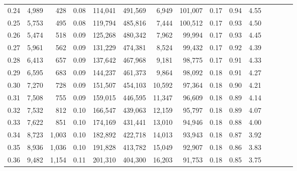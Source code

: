 \begin{tabular}{rrrcrrrrrrrrrrr}
0.24 &   4,989 &    428 &                                       0.08 &  114,041 &  491,569 &    6,949 &  101,007 &  0.17 &  0.94 &                         4.55 \\
0.25 &   5,753 &    495 &                                       0.08 &  119,794 &  485,816 &    7,444 &  100,512 &  0.17 &  0.93 &                         4.50 \\
0.26 &   5,474 &    518 &                                       0.09 &  125,268 &  480,342 &    7,962 &   99,994 &  0.17 &  0.93 &                         4.45 \\
0.27 &   5,961 &    562 &                                       0.09 &  131,229 &  474,381 &    8,524 &   99,432 &  0.17 &  0.92 &                         4.39 \\
0.28 &   6,413 &    657 &                                       0.09 &  137,642 &  467,968 &    9,181 &   98,775 &  0.17 &  0.91 &                         4.33 \\
0.29 &   6,595 &    683 &                                       0.09 &  144,237 &  461,373 &    9,864 &   98,092 &  0.18 &  0.91 &                         4.27 \\
0.30 &   7,270 &    728 &                                       0.09 &  151,507 &  454,103 &   10,592 &   97,364 &  0.18 &  0.90 &                         4.21 \\
0.31 &   7,508 &    755 &                                       0.09 &  159,015 &  446,595 &   11,347 &   96,609 &  0.18 &  0.89 &                         4.14 \\
0.32 &   7,532 &    812 &                                       0.10 &  166,547 &  439,063 &   12,159 &   95,797 &  0.18 &  0.89 &                         4.07 \\
0.33 &   7,622 &    851 &                                       0.10 &  174,169 &  431,441 &   13,010 &   94,946 &  0.18 &  0.88 &                         4.00 \\
0.34 &   8,723 &  1,003 &                                       0.10 &  182,892 &  422,718 &   14,013 &   93,943 &  0.18 &  0.87 &                         3.92 \\
0.35 &   8,936 &  1,036 &                                       0.10 &  191,828 &  413,782 &   15,049 &   92,907 &  0.18 &  0.86 &                         3.83 \\
0.36 &   9,482 &  1,154 &                                       0.11 &  201,310 &  404,300 &   16,203 &   91,753 &  0.18 &  0.85 &                         3.75 \\

\end{tabular}
